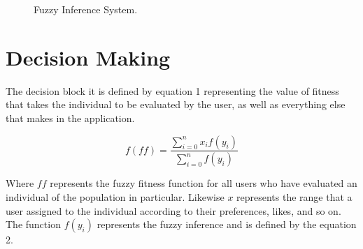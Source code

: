 \begin{figure}
\captionsetup{justification=centering,margin=2cm}
\centering
\setlength\fboxsep{0pt}
\setlength\fboxrule{0.7pt}
\caption{Fuzzy Inference System.}
\label{fig:Fuzzy}       
\end{figure}


\section{Decision Making}
The decision block it is defined by equation 1 representing the value of fitness that takes the individual to be evaluated by the user, as well as everything else that makes in the application.

\begin{equation}\label{eq:centerM}
\displaystyle f(ff)=\frac{\sum_{i=0}^{n}x_{i}f(y_{i})}{\sum_{i=0}^{n}f(y_{i})}
\end{equation}

Where  $ff$ represents the fuzzy fitness function for all users who have evaluated an individual of the population in particular.
Likewise $x$ represents the range that a user assigned to the individual according to their preferences, likes, and so on. The function $f(y_i)$ represents the fuzzy inference and is defined by the equation 2.

